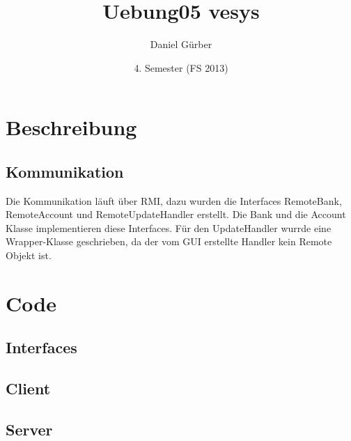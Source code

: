 \documentclass[10pt]{article}
\title{
\vspace{5cm}
Uebung05 vesys
}
\author{Daniel Gürber}
\date{4. Semester (FS 2013)}
\begin{document}
\maketitle
\thispagestyle{fancy}

\newpage

\tableofcontents	


\newpage
\setcounter{page}{1}

\section{Beschreibung}
\subsection{Kommunikation}
Die Kommunikation läuft über RMI, dazu wurden die Interfaces RemoteBank, RemoteAccount und RemoteUpdateHandler erstellt. Die Bank und die Account Klasse implementieren diese Interfaces. Für den UpdateHandler wurrde eine Wrapper-Klasse geschrieben, da der vom GUI erstellte Handler kein Remote Objekt ist. 
\section{Code}
\subsection{Interfaces}



\subsection{Client}


\subsection{Server}





\end{document}
